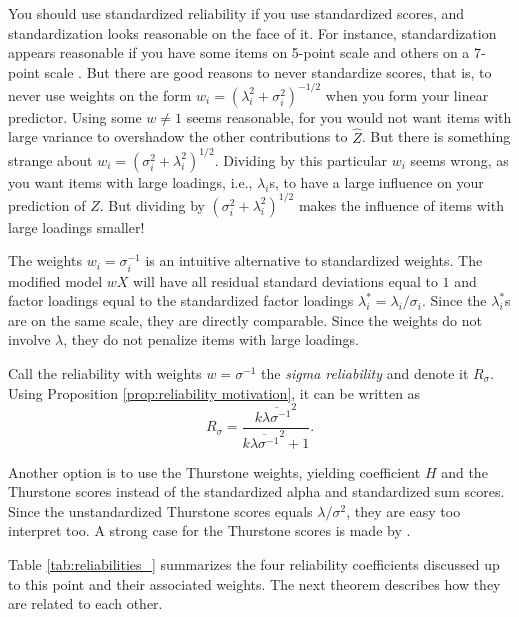 \documentclass[twoside]{article}
\begin{document}
You should use standardized reliability if you use standardized scores, and standardization looks reasonable on the face of it. For instance, standardization appears reasonable if you have some items on 5-point scale and others on a 7-point scale \citep[p. 139]{Furr2013-yu}. But there are good reasons to never standardize scores, that is, to never use weights on the form $w_{i}=(\lambda_{i}^{2}+\sigma_{i}^{2})^{-1/2}$ when you form your linear predictor.
Using some $w\ne1$ seems reasonable, for you would not want items
with large variance to overshadow the other contributions to $\hat{Z}$.
But there is something strange about $w_i = (\sigma_{i}^{2}+\lambda_{i}^{2})^{1/2}$. Dividing by this particular $w_i$
seems wrong, as you want items with large loadings, i.e., $\lambda_{i}$s, to have a large
influence on your prediction of $Z$. But dividing by $(\sigma_{i}^{2}+\lambda_{i}^{2})^{1/2}$
makes the influence of items with large loadings smaller!

The weights $w_i=\sigma_{i}^{-1}$ is an intuitive alternative to standardized weights. The modified model $wX$ will have all residual standard deviations equal to $1$ and factor loadings equal to the standardized factor loadings $\lambda_i^* = \lambda_i/\sigma_i$. Since the $\lambda_i^*$s are on the same scale, they are directly comparable. Since the weights do not involve $\lambda$, they do not penalize items with large loadings. 

Call the reliability with weights $w=\sigma^{-1}$ the \textit{sigma reliability} and denote it $ R_\sigma$. Using Proposition \ref{prop:reliability motivation}, it can be written as
\begin{equation}
 R_\sigma=\frac{k\overline{\lambda\sigma^{-1}}^{2}}{k\overline{\lambda\sigma^{-1}}^{2}+1}.\label{eq:Sigma-standardized reliability}
\end{equation}

Another option is to use the Thurstone weights, yielding coefficient $H$ and the Thurstone scores instead of the standardized alpha and standardized sum scores. Since the unstandardized Thurstone scores equals $\lambda/\sigma^2$, they are easy too interpret too. A strong case for the Thurstone scores is made by \citet{McNeish2019-ea}.

Table \ref{tab:reliabilities_} summarizes the four reliability coefficients discussed up to this point and their associated weights. The next theorem describes how they are related to each other. 
\end{document}
